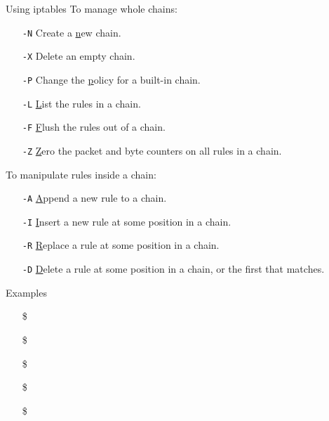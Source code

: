 \begin{frame}{Using iptables}
  To manage whole chains:
  \begin{itemize}
  \item[\texttt{-N}] Create a \underline{n}ew chain.
  \item[\texttt{-X}] Delete an empty chain.
  \item[\texttt{-P}] Change the \underline{p}olicy for a built-in chain.
  \item[\texttt{-L}] \underline{L}ist the rules in a chain.
  \item[\texttt{-F}] \underline{F}lush the rules out of a chain.
  \item[\texttt{-Z}] \underline{Z}ero the packet and byte counters on all rules in a chain.
  \end{itemize}
  To manipulate rules inside a chain:
  \begin{itemize}
  \item[\texttt{-A}] \underline{A}ppend a new rule to a chain.
  \item[\texttt{-I}] \underline{I}nsert a new rule at some position in a chain.
  \item[\texttt{-R}] \underline{R}eplace a rule at some position in a chain.
  \item[\texttt{-D}] \underline{D}elete a rule at some position in a chain, or the first that matches.
  \end{itemize}
\end{frame}

\begin{frame}{Examples}
  \begin{itemize}
  \item[\$] 
  \item[\$] 
  \item[\$] 
  \item[\$] 
  \item[\$] 
  \end{itemize}
\end{frame}

